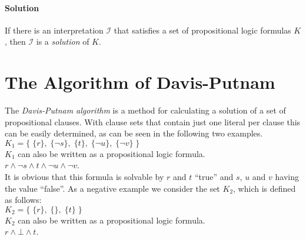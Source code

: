 \paragraph{Solution}
If there is an interpretation $\mathcal{I}$ that satisfies a set of propositional logic formulas $K$, then $\mathcal{I}$ is a \emph{solution} of $K$.

\section{The Algorithm of Davis-Putnam}
\label{sec:sciDavisPutnam}
The \textit{Davis-Putnam algorithm} is a method for calculating a solution of a set of propositional clauses. With clause sets that contain just one literal per clause this can be easily determined, as can be seen in the following two examples.
\\[0.2cm]
\hspace*{1.3cm} $K_1 = \bigl\{\; \{r\},\; \{\neg s\},\; \{t\},\; \{\neg u\}, \; \{\neg v\} \;\bigr\}$ 
\\[0.2cm]
$K_1$ can also be written as a propositional logic formula.
\\[0.2cm]
\hspace*{1.3cm} $r \land \neg s \land t \land \neg u \land \neg v$.
\\[0.2cm]
It is obvious that this formula is solvable by $r$ and $t$ \enquote{true} and $s$, $u$ and $v$ having the value \enquote{false}.
As a negative example we consider the set $K_2$, which is defined as follows:
\\[0.2cm]
\hspace*{1.3cm} $K_2 = \bigl\{\; \{r\},\; \{\},\; \{t\} \;\bigr\}$
\\[0.2cm]
$K_2$ can also be written as a propositional logic formula.
\\[0.2cm]
\hspace*{1.3cm}
$r \land \bot \land t$.
